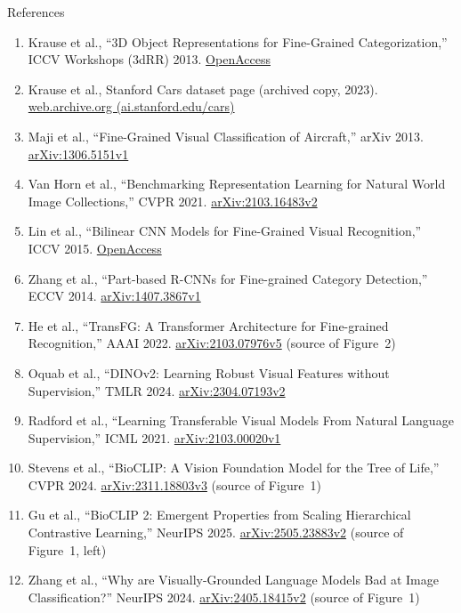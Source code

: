\begin{frame}[allowframebreaks]{References}
\begin{enumerate}
    \item Krause et al., ``3D Object Representations for Fine-Grained Categorization,'' ICCV Workshops (3dRR) 2013. \href{https://openaccess.thecvf.com/content_iccv_workshops_2013/W19/html/Krause_3D_Object_Representations_2013_ICCV_paper.html}{OpenAccess}
    \item Krause et al., Stanford Cars dataset page (archived copy, 2023). \href{https://web.archive.org/web/20230405013536/https://ai.stanford.edu/~jkrause/cars/car_dataset.html}{web.archive.org (ai.stanford.edu/cars)}
    \item Maji et al., ``Fine-Grained Visual Classification of Aircraft,'' arXiv 2013. \href{https://arxiv.org/abs/1306.5151v1}{arXiv:1306.5151v1}
    \item Van Horn et al., ``Benchmarking Representation Learning for Natural World Image Collections,'' CVPR 2021. \href{https://arxiv.org/abs/2103.16483v2}{arXiv:2103.16483v2}
    \item Lin et al., ``Bilinear CNN Models for Fine-Grained Visual Recognition,'' ICCV 2015. \href{https://openaccess.thecvf.com/content_iccv_2015/html/Lin_Bilinear_CNN_Models_ICCV_2015_paper.html}{OpenAccess}
    \item Zhang et al., ``Part-based R-CNNs for Fine-grained Category Detection,'' ECCV 2014. \href{https://arxiv.org/abs/1407.3867v1}{arXiv:1407.3867v1}
    \item He et al., ``TransFG: A Transformer Architecture for Fine-grained Recognition,'' AAAI 2022. \href{https://arxiv.org/abs/2103.07976v5}{arXiv:2103.07976v5} (source of Figure~2)
    \item Oquab et al., ``DINOv2: Learning Robust Visual Features without Supervision,'' TMLR 2024. \href{https://arxiv.org/abs/2304.07193v2}{arXiv:2304.07193v2}
    \item Radford et al., ``Learning Transferable Visual Models From Natural Language Supervision,'' ICML 2021. \href{https://arxiv.org/abs/2103.00020v1}{arXiv:2103.00020v1}
    \item Stevens et al., ``BioCLIP: A Vision Foundation Model for the Tree of Life,'' CVPR 2024. \href{https://arxiv.org/abs/2311.18803v3}{arXiv:2311.18803v3} (source of Figure~1)
    \item Gu et al., ``BioCLIP 2: Emergent Properties from Scaling Hierarchical Contrastive Learning,'' NeurIPS 2025. \href{https://arxiv.org/abs/2505.23883v2}{arXiv:2505.23883v2} (source of Figure~1, left)
    \item Zhang et al., ``Why are Visually-Grounded Language Models Bad at Image Classification?'' NeurIPS 2024. \href{https://arxiv.org/abs/2405.18415v2}{arXiv:2405.18415v2} (source of Figure~1)

\end{enumerate}
\end{frame}
